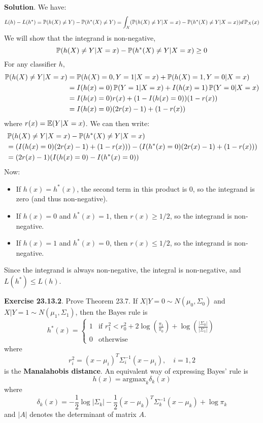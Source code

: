 \textbf{Solution}. We have:
\[
L(h) - L(h^{*}) = \PROB(h(X) \neq Y) - \PROB(h^{*}(X) \neq Y) 
= \int_{\mathcal{X}} \left( \PROB(h(X) \neq Y | X = x) - \PROB(h^{*}(X) \neq Y | X = x) \right) d\PROB_X(x)
\]
We will show that the integrand is non-negative,
\[
\operatorname{\mathbb{P}}(h(X) \neq Y | X = x) - \operatorname{\mathbb{P}}(h^{*}(X) \neq Y | X = x) \geq 0
\]
For any classifier \(h\),
\begin{align*}
\operatorname{\mathbb{P}}(h(X) \neq Y | X = x) &= \operatorname{\mathbb{P}}(h(X) = 0, Y = 1 | X = x) + \operatorname{\mathbb{P}}(h(X) = 1, Y = 0 | X = x) \\
&= I(h(x) = 0) \operatorname{\mathbb{P}}(Y = 1 | X = x) + I(h(x) = 1) \operatorname{\mathbb{P}}(Y = 0 | X = x) \\
&= I(h(x) = 0) r(x) + (1 - I(h(x) = 0)) (1 - r(x)) \\
&= I(h(x) = 0) (2 r(x) - 1) + (1 - r(x))
\end{align*}
where \(r(x) = \operatorname{\mathbb{E}}(Y | X = x)\). We can then write:
\begin{align*}
&\PROB(h(X) \neq Y | X = x) - \PROB(h^{*}(X) \neq Y | X = x) \\
&= \left(I(h(x) = 0) (2 r(x) - 1) + (1 - r(x)) \right) - \left(I(h^{*}(x) = 0) (2 r(x) - 1) + (1 - r(x)) \right) \\
&= (2 r(x) - 1) \left( I(h(x) = 0) - I(h^{*}(x) = 0) \right)
\end{align*}
Now:
\begin{itemize}[tightlist]
\item
  If \(h(x) = h^{*}(x)\), the second term in this product is 0, so the
  integrand is zero (and thus non-negative).
\item
  If \(h(x) = 0\) and \(h^{*}(x) = 1\), then \(r(x) \geq 1/2\), so the
  integrand is non-negative.
\item
  If \(h(x)= 1\) and \(h^{*}(x) = 0\), then \(r(x) \leq 1/2\), so the
  integrand is non-negative.
\end{itemize}
Since the integrand is always non-negative, the integral is
non-negative, and \(L(h^{*}) \leq L(h)\).

\textbf{Exercise 23.13.2}. Prove Theorem 23.7.
If \(X | Y = 0 \sim N(\mu_{0}, \Sigma_{0})\) and
\(X | Y = 1 \sim N(\mu_{1}, \Sigma_{1})\), then the Bayes rule is
\[
h^{*}(x) = \begin{cases}
1 & \text{if } r_{1}^{2} < r_{0}^{2} + 2 \log \left( \frac{\pi_{1}}{\pi_{0}} \right) + \log \left( \frac{| \Sigma_{0} | }{ | \Sigma_{1}| }
\right) \\
0 & \text{otherwise} 
\end{cases}
\]
where
\[
r_{i}^{2} = (x - \mu_{i})^T \Sigma_{i}^{-1}(x - \mu_{i}), \quad i = 1, 2
\]
is the \textbf{Manalahobis distance}. An equivalent way of expressing
Bayes' rule is
\[
h(x) = \text{argmax}_{k} \delta_{k}(x)
\]
where
\[
\delta_{k}(x) = -\frac{1}{2} \log | \Sigma_{k} | - \frac{1}{2} (x - \mu_{k})^T \Sigma_{k}^{-1} (x - \mu_{k}) + \log \pi_{k}
\]
and \(|A|\) denotes the determinant of matrix \(A\).

